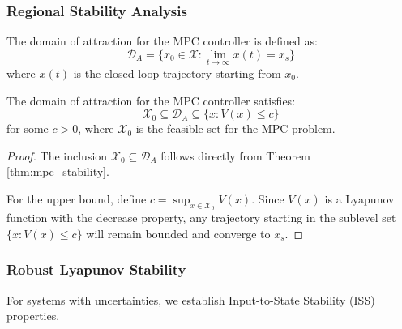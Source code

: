 \subsubsection{Regional Stability Analysis}

\begin{definition}
The domain of attraction for the MPC controller is defined as:
$$\mathcal{D}_A = \{x_0 \in \mathcal{X} : \lim_{t \to \infty} x(t) = x_s\}$$
where $x(t)$ is the closed-loop trajectory starting from $x_0$.
\end{definition}

\begin{theorem}
\label{thm:domain_attraction}
The domain of attraction for the MPC controller satisfies:
$$\mathcal{X}_0 \subseteq \mathcal{D}_A \subseteq \{x : V(x) \leq c\}$$
for some $c > 0$, where $\mathcal{X}_0$ is the feasible set for the MPC problem.
\end{theorem}

\begin{proof}
The inclusion $\mathcal{X}_0 \subseteq \mathcal{D}_A$ follows directly from Theorem \ref{thm:mpc_stability}.

For the upper bound, define $c = \sup_{x \in \mathcal{X}_0} V(x)$. Since $V(x)$ is a Lyapunov function with the decrease property, any trajectory starting in the sublevel set $\{x : V(x) \leq c\}$ will remain bounded and converge to $x_s$.
\end{proof}

\subsubsection{Robust Lyapunov Stability}

For systems with uncertainties, we establish Input-to-State Stability (ISS) properties.

